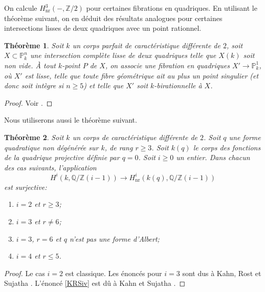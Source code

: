 \documentclass[JEP,XML,SOM,Unicode,francais,published]{cedram}
\newenvironment{enumeratei}
{\bgroup\def\theenumi{\roman{enumi}}\def\theenumii{\arabic{enumii}}\begin{enumerate}}
{\end{enumerate}\egroup}
\newtheorem{thm}{Théorème}[section]
\theoremstyle{definition}
\newcommand{\Q}{\mathbb Q}
\newcommand{\Z}{\mathbb Z}
\renewcommand{\P}{\mathbb P}
\newcommand{\on}[1]{\operatorname{#1}}
\begin{document}
On calcule $H^3_{\on{nr}}(-,\Z/2)$ pour certaines fibrations en quadriques. En utilisant le théorème suivant, on en déduit des résultats analogues pour certaines intersections lisses de deux quadriques avec un point rationnel.

\begin{thm}\label{theorem3.2}
Soit $k$ un corps parfait de caractéristique différente de $2$, soit \hbox{$X\subset \P^n_k$} une intersection complète lisse de deux quadriques telle que $X(k)$ soit non vide. À tout $k$-point $P$ de $X$, on associe une fibration en quadriques $X'\to\P^1_k$, où $X'$ est lisse, telle que toute fibre géométrique ait au plus un point singulier (et donc soit intègre si $n\geq 5$) et telle que $X'$ soit $k$-birationnelle à $X$.
\end{thm}

\begin{proof}
Voir \cite[Th.\,3.2, (3.4) p.\,61, Rem.\,1.13.1]{colliot1987intersectionsI}.
\end{proof}

Nous utiliserons aussi le théorème suivant.
\begin{thm}\label{KRS}
Soit $k$ un corps de caractéristique différente de $2$.
Soit $q$ une forme quadratique non dégénérée sur $k$, de rang $r\geq 3$. Soit $k(q)$ le corps des fonctions de la quadrique projective définie par $q=0$.
Soit $i \geq 0$ un entier. Dans chacun des cas suivants, l'application
\[
H^{i}(k,\Q/\Z(i-1)) \to H^{i}_{\on{nr}}(k(q), \Q/\Z(i-1))
\]
est surjective:
\begin{enumeratei}
\item\label{KRSi}
$i=2$ et $r\geq 3$;

\item\label{KRSii}
$i=3$ et $r\neq 6$;

\item\label{KRSiii}
$i=3$, $r=6$ et $q$ n'est pas une forme d'Albert;

\item\label{KRSiv}
$i=4$ et $r\leq 5$.
\end{enumeratei}
\end{thm}

\begin{proof} Le cas $i=2$ est classique. Les énoncés pour $i=3$ sont dus à Kahn, Rost et Sujatha \cite[Th.\,5, Cor.\,10(2)]{kahn1998unramified}. L'énoncé \eqref{KRSiv} est dû à Kahn et Sujatha \cite[Th.\,3]{kahnsuja1998unramified}.
\end{proof}
\end{document}
